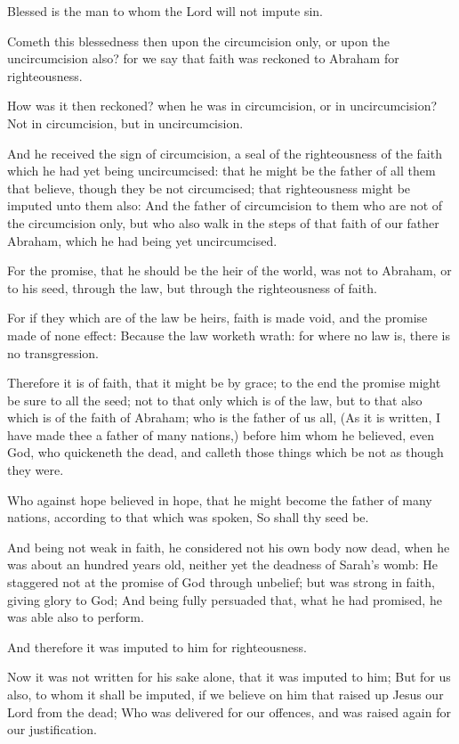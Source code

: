 \Verse Blessed is the man to whom the Lord will not impute sin.

\Verse Cometh this blessedness then upon the circumcision only, or upon the uncircumcision also? for we say that faith was reckoned to Abraham for righteousness.

\Verse How was it then reckoned? when he was in circumcision, or in uncircumcision? Not in circumcision, but in uncircumcision.

\Verse And he received the sign of circumcision, a seal of the righteousness of the faith which he had yet being uncircumcised: that he might be the father of all them that believe, though they be not circumcised; that righteousness might be imputed unto them also: \Verse And the father of circumcision to them who are not of the circumcision only, but who also walk in the steps of that faith of our father Abraham, which he had being yet uncircumcised.

\Verse For the promise, that he should be the heir of the world, was not to Abraham, or to his seed, through the law, but through the righteousness of faith.

\Verse For if they which are of the law be heirs, faith is made void, and the promise made of none effect: \Verse Because the law worketh wrath: for where no law is, there is no transgression.

\Verse Therefore it is of faith, that it might be by grace; to the end the promise might be sure to all the seed; not to that only which is of the law, but to that also which is of the faith of Abraham; who is the father of us all, \Verse (As it is written, I have made thee a father of many nations,) before him whom he believed, even God, who quickeneth the dead, and calleth those things which be not as though they were.

\Verse Who against hope believed in hope, that he might become the father of many nations, according to that which was spoken, So shall thy seed be.

\Verse And being not weak in faith, he considered not his own body now dead, when he was about an hundred years old, neither yet the deadness of Sarah's womb: \Verse He staggered not at the promise of God through unbelief; but was strong in faith, giving glory to God; \Verse And being fully persuaded that, what he had promised, he was able also to perform.

\Verse And therefore it was imputed to him for righteousness.

\Verse Now it was not written for his sake alone, that it was imputed to him; \Verse But for us also, to whom it shall be imputed, if we believe on him that raised up Jesus our Lord from the dead; \Verse Who was delivered for our offences, and was raised again for our justification.


